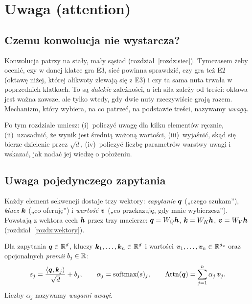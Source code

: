 \chapter{Uwaga (attention)}\label{rozdz:uwaga}

\section{Czemu konwolucja nie wystarcza?}

Konwolucja patrzy na stały, mały sąsiad (rozdział~\ref{rozdz:siec}). Tymczasem żeby ocenić, czy w danej klatce gra E3, sieć powinna
sprawdzić, czy gra też E2 (oktawę niżej, której alikwoty zlewają się z E3) i czy ta sama nuta trwała w poprzednich klatkach. To są
\emph{dalekie} zależności, a ich siła zależy od treści: oktawa jest ważna zawsze, ale tylko wtedy, gdy dwie nuty rzeczywiście grają razem.
Mechanizm, który wybiera, na co patrzeć, na podstawie treści, nazywamy \emph{uwagą}.

Po tym rozdziale umiesz: (i)~policzyć uwagę dla kilku elementów ręcznie, (ii)~uzasadnić, że wynik jest średnią ważoną wartości,
(iii)~wyjaśnić, skąd się bierze dzielenie przez $\sqrt{d}$, (iv)~policzyć liczbę parametrów warstwy uwagi i wskazać, jak nadać jej wiedzę o położeniu.

\section{Uwaga pojedynczego zapytania}

Każdy element sekwencji dostaje trzy wektory: \emph{zapytanie} $\bm{q}$ („czego szukam”), \emph{klucz} $\bm{k}$ („co oferuję”) i \emph{wartość} $\bm{v}$ („co przekazuję, gdy mnie wybierzesz”).
Powstają z wektora cech $\bm{h}$ przez trzy macierze: $\bm{q}=W_Q\bm{h}$, $\bm{k}=W_K\bm{h}$, $\bm{v}=W_V\bm{h}$ (rozdział~\ref{rozdz:wektory}).

\begin{definicja}\label{def:uwaga}
Dla zapytania $\bm{q}\in\mathbb{R}^d$, kluczy $\bm{k}_1,\dots,\bm{k}_n\in\mathbb{R}^d$ i wartości $\bm{v}_1,\dots,\bm{v}_n\in\mathbb{R}^{d_v}$ oraz opcjonalnych \emph{premii} $b_j\in\mathbb{R}$:
\begin{equation}
  s_j=\frac{\left\langle \bm{q},\bm{k}_j\right\rangle}{\sqrt d}+b_j,\qquad
  \alpha_j=\operatorname{softmax}(s)_j,\qquad
  \operatorname{Attn}(\bm{q})=\sum_{j=1}^{n}\alpha_j\,\bm{v}_j .
\end{equation}
Liczby $\alpha_j$ nazywamy \emph{wagami uwagi}.
\end{definicja}

